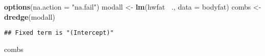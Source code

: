 \documentclass[]{article}
\newenvironment{Shaded}{\begin{snugshade}}{\end{snugshade}}
\newcommand{\DataTypeTok}[1]{\textcolor[rgb]{0.13,0.29,0.53}{#1}}
\newcommand{\KeywordTok}[1]{\textcolor[rgb]{0.13,0.29,0.53}{\textbf{#1}}}
\newcommand{\NormalTok}[1]{#1}
\newcommand{\OperatorTok}[1]{\textcolor[rgb]{0.81,0.36,0.00}{\textbf{#1}}}
\newcommand{\StringTok}[1]{\textcolor[rgb]{0.31,0.60,0.02}{#1}}
\begin{document}
\begin{Shaded}
\begin{Highlighting}[]
\KeywordTok{options}\NormalTok{(}\DataTypeTok{na.action =} \StringTok{"na.fail"}\NormalTok{)}
\NormalTok{modall <-}\StringTok{ }\KeywordTok{lm}\NormalTok{(hwfat }\OperatorTok{~}\NormalTok{., }\DataTypeTok{data =}\NormalTok{ bodyfat)}
\NormalTok{combs <-}\StringTok{ }\KeywordTok{dredge}\NormalTok{(modall)}
\end{Highlighting}
\end{Shaded}

\begin{verbatim}
## Fixed term is "(Intercept)"
\end{verbatim}

\begin{Shaded}
\begin{Highlighting}[]
\NormalTok{combs}
\end{Highlighting}
\end{Shaded}
\end{document}
